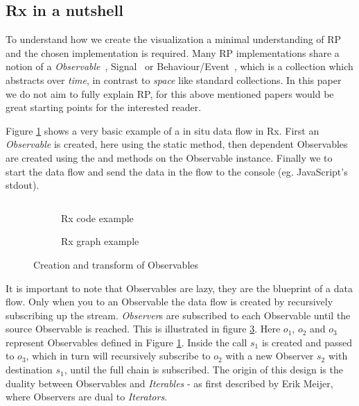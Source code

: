 \subsection{Rx in a nutshell}
\label{nutshell}
To understand how we create the visualization a minimal understanding of RP and the chosen implementation is required. Many RP implementations share a notion of a \textit{Observable}~\cite{meijer2010subject}, Signal~\cite{czaplicki2012elm} or Behaviour/Event~\cite{elliott1997functional},  which is a collection which abstracts over \textit{time}, in contrast to \textit{space} like standard collections. In this paper we do not aim to fully explain RP, for this above mentioned papers would be great starting points for the interested reader.

Figure \ref{sample1} shows a very basic example of a in situ data flow in Rx. First an \textit{Observable} is created, here using the static  method, then dependent Observables are created using the  and  methods on the Observable instance. Finally we  to start the data flow and send the data in the flow to the console (eg. JavaScript's stdout).

\begin{figure}

\begin{subfigure}[a]{\columnwidth}
\inputminted[tabsize=2]{javascript}{listings/sample1.js}	
\caption{Rx code example}
\label{sample1}
\end{subfigure}

\begin{subfigure}[b]{\columnwidth}
\centering

\caption{Rx graph example}
\label{chaincreate}
\end{subfigure}

\caption{Creation and transform of Observables}

\end{figure}

It is important to note that Observables are lazy, they are the blueprint of a data flow. Only when you  to an Observable the data flow is created by recursively subscribing up the stream. \textit{Observer}s are subscribed to each Observable until the source Observable is reached.
This is illustrated in figure \ref{chaincreate}. Here $o_1$, $o_2$ and $o_3$ represent Observables defined in Figure \ref{sample1}. Inside the  call $s_1$ is created and passed to $o_3$, which in turn will recursively subscribe to $o_2$ with a new Observer $s_2$ with destination $s_1$, until the full chain is subscribed.
The origin of this design is the duality between Observables and \textit{Iterables} - as first described by Erik Meijer, where Observers are dual to \textit{Iterators}.


